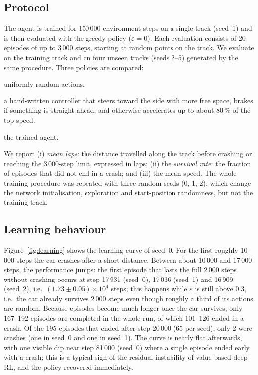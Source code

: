 \documentclass[11pt,a4paper]{article}
\begin{document}
\subsection{Protocol}
The agent is trained for 150\,000 environment steps on a single track (seed~1) and is then evaluated with the greedy policy (\(\varepsilon=0\)).
Each evaluation consists of 20 episodes of up to 3\,000 steps, starting at random points on the track.
We evaluate on the training track and on four unseen tracks (seeds 2--5) generated by the same procedure.
Three policies are compared:
\begin{description}[leftmargin=1.5em]
  \item[Random:] uniformly random actions.
  \item[Heuristic:] a hand-written controller that steers toward the side with more free space, brakes if something is straight ahead, and otherwise accelerates up to about 80\,\% of the top speed.
  \item[DQN:] the trained agent.
\end{description}
We report (i) \emph{mean laps}: the distance travelled along the track before crashing or reaching the 3\,000-step limit, expressed in laps; (ii) the \emph{survival rate}: the fraction of episodes that did not end in a crash; and (iii) the mean speed.
The whole training procedure was repeated with three random seeds (0, 1, 2), which change the network initialisation, exploration and start-position randomness, but not the training track.

\subsection{Learning behaviour}
Figure~\ref{fig:learning} shows the learning curve of seed~0.
For the first roughly 10\,000 steps the car crashes after a short distance.
Between about 10\,000 and 17\,000 steps, the performance jumps: the first episode that lasts the full 2\,000 steps without crashing occurs at step 17\,931 (seed~0), 17\,036 (seed~1) and 16\,909 (seed~2), i.e.\ \((1.73\pm0.05)\times10^{4}\) steps; this happens while \(\varepsilon\) is still above 0.3, i.e.\ the car already survives 2\,000 steps even though roughly a third of its actions are random.
Because episodes become much longer once the car survives, only 167--192 episodes are completed in the whole run, of which 101--126 ended in a crash. Of the 195 episodes that ended after step 20\,000 (65 per seed), only 2 were crashes (one in seed~0 and one in seed~1).
The curve is nearly flat afterwards, with one visible dip near step 81\,000 (seed~0) where a single episode ended early with a crash; this is a typical sign of the residual instability of value-based deep RL, and the policy recovered immediately.
\end{document}
